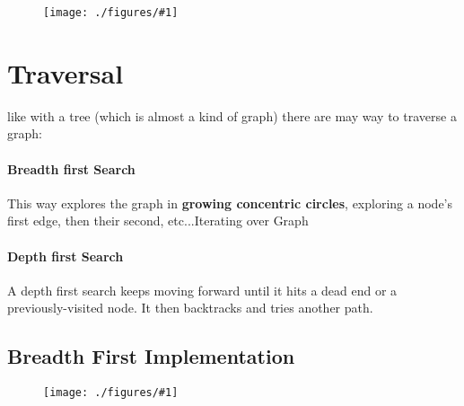 \documentclass[12pt]{book}
\newcommand{\incimg}[2]{%
       \begin{figure}[h]
               \centering
               \texttt{[image: ./figures/\#1]}
       \end{figure}
}
\begin{document}
\incimg{code}{0.5}

\section*{Traversal}
like with a tree (which is almost a kind of graph) there are may
way to traverse a graph:

\paragraph{Breadth first Search}
This way explores the graph in \textbf{growing concentric circles}, exploring a
node's first edge, then their second, etc...Iterating over Graph

\paragraph{Depth first Search}
A depth first search keeps moving forward until it hits a dead end or a 
previously-visited node. It then backtracks and tries another path.

\subsection*{Breadth First Implementation}
\incimg{bftCode}{0.5}
\end{document}

